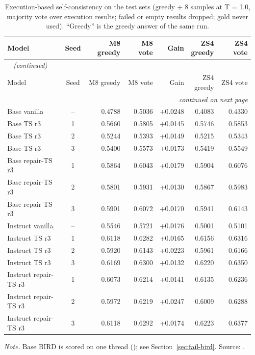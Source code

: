 {\small
{}
\setlength{\tabcolsep}{4.2pt}
\begin{longtable}{@{}lcrrrrr@{}}
\caption{Execution-based self-consistency on the test sets (greedy + 8 samples at T = 1.0, majority vote over execution results; failed or empty results dropped; gold never used). ``Greedy'' is the greedy answer of the same run.}\label{tab:gen-sc-test}\\
\toprule
\rowcolor{headshade}Model & Seed & M8 greedy & M8 vote & Gain & \makecell{ZS4\\greedy} & ZS4 vote\\
\midrule
\endfirsthead
\multicolumn{7}{l}{\textit{\tablename~\thetable{} (continued)}}\\
\toprule
\rowcolor{headshade}Model & Seed & M8 greedy & M8 vote & Gain & \makecell{ZS4\\greedy} & ZS4 vote\\
\midrule
\endhead
\midrule
\multicolumn{7}{r}{\textit{continued on next page}}\\
\endfoot
\bottomrule
\endlastfoot
Base vanilla & -- & 0.4788 & 0.5036 & +0.0248 & 0.4083 & 0.4330\\
Base TS r3 & 1 & 0.5660 & 0.5805 & +0.0145 & 0.5746 & 0.5853\\
Base TS r3 & 2 & 0.5244 & 0.5393 & +0.0149 & 0.5215 & 0.5343\\
Base TS r3 & 3 & 0.5400 & 0.5573 & +0.0173 & 0.5419 & 0.5549\\
Base repair-TS r3 & 1 & 0.5864 & 0.6043 & +0.0179 & 0.5904 & 0.6076\\
Base repair-TS r3 & 2 & 0.5801 & 0.5931 & +0.0130 & 0.5867 & 0.5983\\
Base repair-TS r3 & 3 & 0.5901 & 0.6072 & +0.0170 & 0.5941 & 0.6143\\
Instruct vanilla & -- & 0.5546 & 0.5721 & +0.0176 & 0.5001 & 0.5101\\
Instruct TS r3 & 1 & 0.6118 & 0.6282 & +0.0165 & 0.6156 & 0.6316\\
Instruct TS r3 & 2 & 0.5920 & 0.6143 & +0.0223 & 0.5961 & 0.6166\\
Instruct TS r3 & 3 & 0.6169 & 0.6300 & +0.0132 & 0.6220 & 0.6350\\
Instruct repair-TS r3 & 1 & 0.6073 & 0.6214 & +0.0141 & 0.6135 & 0.6236\\
Instruct repair-TS r3 & 2 & 0.5972 & 0.6219 & +0.0247 & 0.6009 & 0.6288\\
Instruct repair-TS r3 & 3 & 0.6118 & 0.6292 & +0.0174 & 0.6223 & 0.6377\\
\end{longtable}
}
\vspace{-0.6\baselineskip}
{\footnotesize\color{slate}\textit{Note.} Base BIRD is scored on one thread (); see Section~\ref{sec:fail-bird}. Source: .\par}
\medskip

